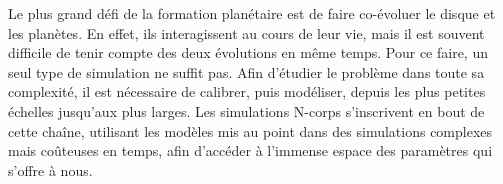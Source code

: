Le plus grand défi de la formation planétaire est de faire co-évoluer le disque et les planètes. En effet, ils interagissent au cours de leur vie, mais il est souvent difficile de tenir compte des deux évolutions en même temps. Pour ce faire, un seul type de simulation ne suffit pas. Afin d'étudier le problème dans toute sa complexité, il est nécessaire de calibrer, puis modéliser, depuis les plus petites échelles jusqu'aux plus larges. Les simulations N-corps s'inscrivent en bout de cette chaîne, utilisant les modèles mis au point dans des simulations complexes mais coûteuses en temps, afin d'accéder à l'immense espace des paramètres qui s'offre à nous.
